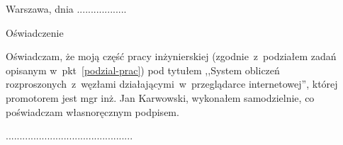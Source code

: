 \documentclass[a4paper,11pt,twoside]{report}
\theoremstyle{definition}
\newcommand{\tytul}{System obliczeń rozproszonych~z~węzłami działającymi~w~przeglądarce internetowej}
\renewcommand{\title}{A system for distributed computing with web browser--based nodes}
\newcommand{\type}{inżyniers} %
\newcommand{\supervisor}{mgr inż. Jan Karwowski}
\begin{document}
\null\thispagestyle{empty}\newpage

{
\begin{abstract}

\begin{center}
\title
\end{center}

Lorem ipsum dolor sit amet, consetetur sadipscing elitr, sed diam nonumyeirmod tempor invidunt ut labore et dolore magna aliquyam erat, sed diamvoluptua. At vero eos et accusam et justo duo dolores et ea rebum. Stet clita kasd gubergren, no sea takimata sanctus est Lorem ipsum dolor sit amet.

Lorem ipsum dolor sit amet, consetetur sadipscing elitr, sed diam nonumyeirmod tempor invidunt ut labore et dolore magna aliquyam erat, sed diamvoluptua. At vero eos et accusam et justo duo dolores et ea rebum. Stet clita kasd gubergren, no sea takimata sanctus est Lorem ipsum dolor sit amet.\\

\noindent \textbf{Keywords:} distributed computing, WebAssembly, web application, performance, parallel computing, web browser, Internet
\end{abstract}
}




\null\thispagestyle{empty}\newpage

\null \hfill Warszawa, dnia ..................\\

\par\vspace{5cm}

\begin{center}
Oświadczenie
\end{center}

\indent Oświadczam, że moją część pracy \type kiej (zgodnie~z~podziałem zadań opisanym w~pkt~\ref{podzial-prac}) pod
tytułem ,,\tytul '', której promotorem jest \supervisor , wykonałem
samodzielnie, co poświadczam własnoręcznym podpisem.
\vspace{2cm}


\begin{flushright}
  \begin{minipage}{50mm}
    \begin{center}
      ..............................................

    \end{center}
  \end{minipage}
\end{flushright}
\end{document}
